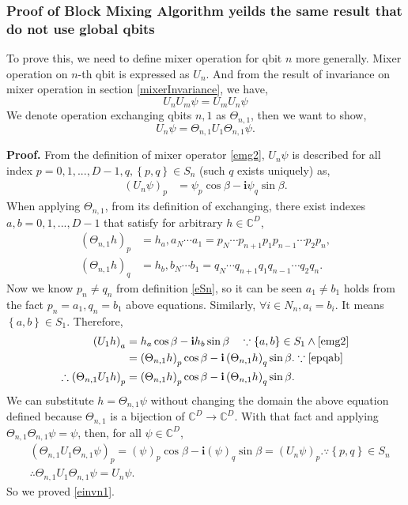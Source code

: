 \documentclass[a4paper]{article}
\newcommand{\eqlabel}[1]{\label{#1}}
\newcommand{\br}[1]{\left(#1\right)}
\newcommand{\cbr}[1]{\left\{#1\right\}}
\newcommand{\sC}{\mathbb{C}}
\newcommand{\ci}{\mathbf{i}}
\begin{document}
\subsubsection{Proof of Block Mixing Algorithm yeilds the same result that do not use global qbits}
\label{sProofBMA}
To prove this, we need to define mixer operation for qbit \(n\) more generally. Mixer operation on \(n\)-th qbit is expressed as \(U_n\). And from the result of invariance on mixer operation in section \ref{mixerInvariance}, we have,
\begin{equation}
    \eqlabel{emixcomm}
 U_n U_{m}\psi = U_m U_n\psi  
\end{equation}
We denote operation exchanging qbits \(n, 1\) as \(\Theta_{n, 1}\), then
we want to show,
\begin{equation}
    \eqlabel{einvn1}
    U_n \psi = \Theta_{n, 1} U_{1} \Theta_{n, 1}\psi .
\end{equation}

\textbf{Proof.}  From the definition of mixer operator \eqref{emg2}, \( U_n \psi\) is described  for all index \(p = 0,1,...,{D-1}, q, \cbr{p, q}\in S_n\) (such \(q\) exists uniquely) as,
\begin{align*}
    \br{U_n \psi}_p &= \psi_p \cos\beta - \ci\psi_q \sin \beta.
\end{align*}
When applying \(\Theta_{n,1}\), from its definition of exchanging, there exist indexes \(a, b=0,1,...,D-1\) that satisfy for arbitrary \(h\in\sC^D\), 
\begin{align}
    \nonumber
    \br{\Theta_{n, 1}h}_{p} &= h_{a}, a_N\cdots a_1 = p_N\cdots p_{n+1}p_1 p_{n-1}\cdots p_2 p_n,\\
    \eqlabel{epqab}
    \br{\Theta_{n, 1}h}_{q} &= h_{b}, b_N\cdots b_1 = q_N\cdots q_{n+1}q_1 q_{n-1}\cdots q_2 q_n.
\end{align}
Now we know \(p_n\neq q_n\) from definition \eqref{eSn}, so it can be seen \(a_1 \neq b_1\) holds from the fact \(p_n = a_1, q_n=b_1\) above equations. Similarly, \(\forall i\in N_n,  a_i=b_i\). It means \(\cbr{a, b}\in S_1\). Therefore,
\begin{align*}
    \br{U_1 h}_{a} & = h_a \cos\beta - \ci h_b \sin \beta\quad \because \cbr{a, b}\in S_1\land \eqref{emg2}\\
    &= \br{\Theta_{n, 1} h}_p\cos\beta - \ci\br{\Theta_{n, 1}h}_q \sin \beta.\because\eqref{epqab}\\
   \therefore \br{\Theta_{n,1} U_1 h}_{p} & = \br{\Theta_{n, 1} h}_p\cos\beta - \ci\br{\Theta_{n, 1}h}_q \sin \beta.
\end{align*}
We can substitute \(h = \Theta_{n,1}\psi\) without changing the domain the above equation defined because \(\Theta_{n,1}\) is a bijection of \(\sC^D\to\sC^D\). With that fact and applying \( \Theta_{n,1}\Theta_{n,1}\psi = \psi\), then, for all \(\psi\in\sC^D\),
\begin{align*}
   &\br{\Theta_{n,1} U_1 \Theta_{n,1}\psi }_{p}  = \br{\psi}_p\cos\beta - \ci\br{\psi}_q \sin \beta = \br{U_n \psi}_p.\because \cbr{p, q}\in S_n\\
   &\therefore \Theta_{n,1} U_1 \Theta_{n,1}\psi = U_n \psi.
\end{align*}
So we proved \eqref{einvn1}.
\end{document}
